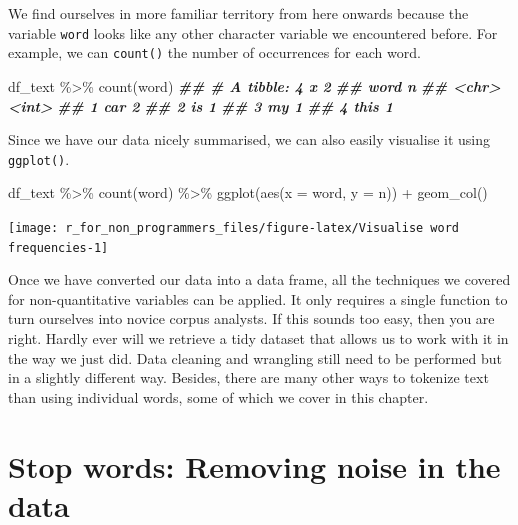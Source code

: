 \documentclass[
]{book}
\newenvironment{Shaded}{\begin{snugshade}}{\end{snugshade}}
\newcommand{\AttributeTok}[1]{\textcolor[rgb]{0.77,0.63,0.00}{#1}}
\newcommand{\DocumentationTok}[1]{\textcolor[rgb]{0.56,0.35,0.01}{\textbf{\textit{#1}}}}
\newcommand{\FunctionTok}[1]{\textcolor[rgb]{0.00,0.00,0.00}{#1}}
\newcommand{\NormalTok}[1]{#1}
\newcommand{\SpecialCharTok}[1]{\textcolor[rgb]{0.00,0.00,0.00}{#1}}
\begin{document}
We find ourselves in more familiar territory from here onwards because the variable \texttt{word} looks like any other character variable we encountered before. For example, we can \texttt{count()} the number of occurrences for each word.

\begin{Shaded}
\begin{Highlighting}[]
\NormalTok{df\_text }\SpecialCharTok{\%\textgreater{}\%} \FunctionTok{count}\NormalTok{(word)}
\DocumentationTok{\#\# \# A tibble: 4 x 2}
\DocumentationTok{\#\#   word      n}
\DocumentationTok{\#\#   \textless{}chr\textgreater{} \textless{}int\textgreater{}}
\DocumentationTok{\#\# 1 car       2}
\DocumentationTok{\#\# 2 is        1}
\DocumentationTok{\#\# 3 my        1}
\DocumentationTok{\#\# 4 this      1}
\end{Highlighting}
\end{Shaded}

Since we have our data nicely summarised, we can also easily visualise it using \texttt{ggplot()}.

\begin{Shaded}
\begin{Highlighting}[]
\NormalTok{df\_text }\SpecialCharTok{\%\textgreater{}\%}
  \FunctionTok{count}\NormalTok{(word) }\SpecialCharTok{\%\textgreater{}\%}
  \FunctionTok{ggplot}\NormalTok{(}\FunctionTok{aes}\NormalTok{(}\AttributeTok{x =}\NormalTok{ word,}
             \AttributeTok{y =}\NormalTok{ n)) }\SpecialCharTok{+}
  \FunctionTok{geom\_col}\NormalTok{()}
\end{Highlighting}
\end{Shaded}

\begin{center}\texttt{[image: r\_for\_non\_programmers\_files/figure-latex/Visualise word frequencies-1]} \end{center}

Once we have converted our data into a data frame, all the techniques we covered for non-quantitative variables can be applied. It only requires a single function to turn ourselves into novice corpus analysts. If this sounds too easy, then you are right. Hardly ever will we retrieve a tidy dataset that allows us to work with it in the way we just did. Data cleaning and wrangling still need to be performed but in a slightly different way. Besides, there are many other ways to tokenize text than using individual words, some of which we cover in this chapter.

\hypertarget{stop-words-removing-noise-in-the-data}{%
\section{Stop words: Removing noise in the data}\label{stop-words-removing-noise-in-the-data}}
\end{document}
